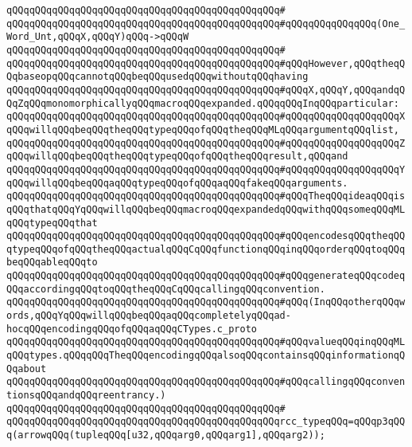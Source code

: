 \verb|qQQqqQQqqQQqqQQqqQQqqQQqqQQqqQQqqQQqqQQqqQQqqQQq#|\newline
\verb|qQQqqQQqqQQqqQQqqQQqqQQqqQQqqQQqqQQqqQQqqQQqqQQq#qQQqqQQqqQQqqQQq(One_Word_Unt,qQQqX,qQQqY)qQQq->qQQqW|\newline
\verb|qQQqqQQqqQQqqQQqqQQqqQQqqQQqqQQqqQQqqQQqqQQqqQQq#|\newline
\verb|qQQqqQQqqQQqqQQqqQQqqQQqqQQqqQQqqQQqqQQqqQQqqQQq#qQQqHowever,qQQqtheqQQqbaseopqQQqcannotqQQqbeqQQqusedqQQqwithoutqQQqhaving|\newline
\verb|qQQqqQQqqQQqqQQqqQQqqQQqqQQqqQQqqQQqqQQqqQQqqQQq#qQQqX,qQQqY,qQQqandqQQqZqQQqmonomorphicallyqQQqmacroqQQqexpanded.qQQqqQQqInqQQqparticular:|\newline
\verb|qQQqqQQqqQQqqQQqqQQqqQQqqQQqqQQqqQQqqQQqqQQqqQQq#qQQqqQQqqQQqqQQqqQQqXqQQqwillqQQqbeqQQqtheqQQqtypeqQQqofqQQqtheqQQqMLqQQqargumentqQQqlist,|\newline
\verb|qQQqqQQqqQQqqQQqqQQqqQQqqQQqqQQqqQQqqQQqqQQqqQQq#qQQqqQQqqQQqqQQqqQQqZqQQqwillqQQqbeqQQqtheqQQqtypeqQQqofqQQqtheqQQqresult,qQQqand|\newline
\verb|qQQqqQQqqQQqqQQqqQQqqQQqqQQqqQQqqQQqqQQqqQQqqQQq#qQQqqQQqqQQqqQQqqQQqYqQQqwillqQQqbeqQQqaqQQqtypeqQQqofqQQqaqQQqfakeqQQqarguments.|\newline
\verb|qQQqqQQqqQQqqQQqqQQqqQQqqQQqqQQqqQQqqQQqqQQqqQQq#qQQqTheqQQqideaqQQqisqQQqthatqQQqYqQQqwillqQQqbeqQQqmacroqQQqexpandedqQQqwithqQQqsomeqQQqMLqQQqtypeqQQqthat|\newline
\verb|qQQqqQQqqQQqqQQqqQQqqQQqqQQqqQQqqQQqqQQqqQQqqQQq#qQQqencodesqQQqtheqQQqtypeqQQqofqQQqtheqQQqactualqQQqCqQQqfunctionqQQqinqQQqorderqQQqtoqQQqbeqQQqableqQQqto|\newline
\verb|qQQqqQQqqQQqqQQqqQQqqQQqqQQqqQQqqQQqqQQqqQQqqQQq#qQQqgenerateqQQqcodeqQQqaccordingqQQqtoqQQqtheqQQqCqQQqcallingqQQqconvention.|\newline
\verb|qQQqqQQqqQQqqQQqqQQqqQQqqQQqqQQqqQQqqQQqqQQqqQQq#qQQq(InqQQqotherqQQqwords,qQQqYqQQqwillqQQqbeqQQqaqQQqcompletelyqQQqad-hocqQQqencodingqQQqofqQQqaqQQqCTypes.c_proto|\newline
\verb|qQQqqQQqqQQqqQQqqQQqqQQqqQQqqQQqqQQqqQQqqQQqqQQq#qQQqvalueqQQqinqQQqMLqQQqtypes.qQQqqQQqTheqQQqencodingqQQqalsoqQQqcontainsqQQqinformationqQQqabout|\newline
\verb|qQQqqQQqqQQqqQQqqQQqqQQqqQQqqQQqqQQqqQQqqQQqqQQq#qQQqcallingqQQqconventionsqQQqandqQQqreentrancy.)|\newline
\verb|qQQqqQQqqQQqqQQqqQQqqQQqqQQqqQQqqQQqqQQqqQQqqQQq#|\newline
\verb|qQQqqQQqqQQqqQQqqQQqqQQqqQQqqQQqqQQqqQQqqQQqqQQqrcc_typeqQQq=qQQqp3qQQq(arrowqQQq(tupleqQQq[u32,qQQqarg0,qQQqarg1],qQQqarg2));|\newline
